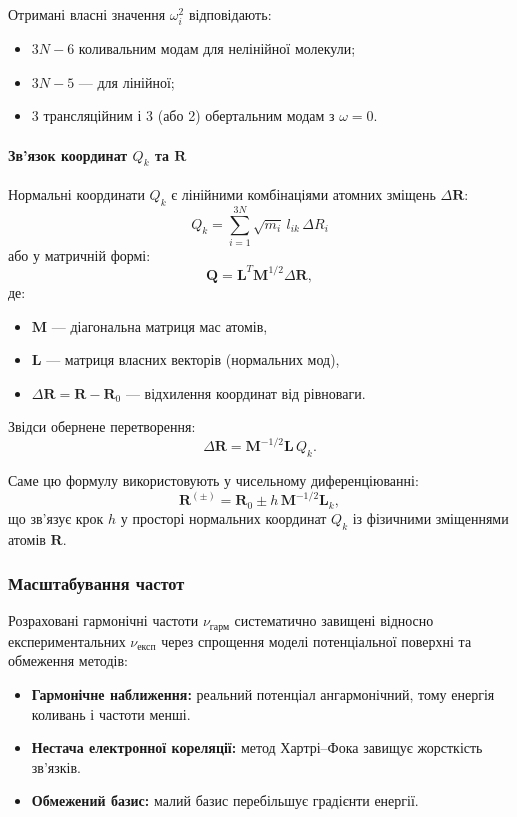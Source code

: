Отримані власні значення $\omega_i^2$ відповідають:
\begin{itemize}
    \item $3N - 6$ коливальним модам для нелінійної молекули;
    \item $3N - 5$ --- для лінійної;
    \item 3 трансляційним і 3 (або 2) обертальним модам з $\omega = 0$.
\end{itemize}

\paragraph{Зв'язок координат $Q_k$ та $\mathbf{R}$}

Нормальні координати $Q_k$ є лінійними комбінаціями атомних зміщень $\Delta \mathbf{R}$:
\[
    Q_k = \sum_{i=1}^{3N} \sqrt{m_i}\, l_{ik}\, \Delta R_i
\]
або у матричній формі:
\[
    \mathbf{Q} = \mathbf{L}^T \mathbf{M}^{1/2} \Delta \mathbf{R},
\]
де:
\begin{itemize}
    \item $\mathbf{M}$ — діагональна матриця мас атомів,
    \item $\mathbf{L}$ — матриця власних векторів (нормальних мод),
    \item $\Delta \mathbf{R} = \mathbf{R} - \mathbf{R}_0$ — відхилення координат від рівноваги.
\end{itemize}

Звідси обернене перетворення:
\[
    \Delta \mathbf{R} = \mathbf{M}^{-1/2} \mathbf{L} \, Q_k.
\]

Саме цю формулу використовують у чисельному диференціюванні:
\[
    \mathbf{R}^{(\pm)} = \mathbf{R}_0 \pm h\, \mathbf{M}^{-1/2} \mathbf{L}_k,
\]
що зв’язує крок $h$ у просторі нормальних координат $Q_k$ із фізичними зміщеннями атомів $\mathbf{R}$.


\subsubsection{Масштабування частот}

Розраховані гармонічні частоти $\nu_{\text{гарм}}$ систематично завищені відносно експериментальних $\nu_{\text{експ}}$ через спрощення моделі потенціальної поверхні та обмеження методів:

\begin{itemize}
    \item \textbf{Гармонічне наближення:} реальний потенціал ангармонічний, тому енергія коливань і частоти менші.
    \item \textbf{Нестача електронної кореляції:} метод Хартрі–Фока завищує жорсткість зв’язків.
    \item \textbf{Обмежений базис:} малий базис перебільшує градієнти енергії.
\end{itemize}

